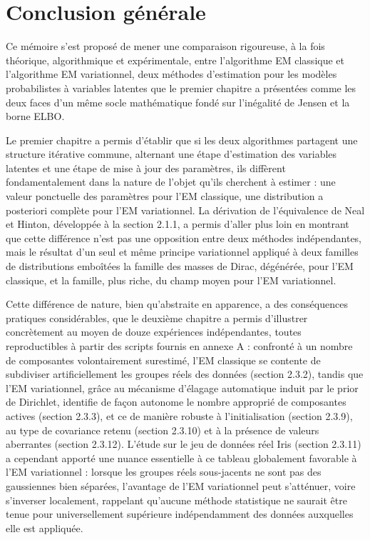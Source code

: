 \chapter*{Conclusion générale}
Ce mémoire s'est proposé de mener une comparaison rigoureuse, à la fois théorique, algorithmique et expérimentale, entre l'algorithme EM classique et l'algorithme EM variationnel, deux méthodes d'estimation pour les modèles probabilistes à variables latentes que le premier chapitre a présentées comme les deux faces d'un même socle mathématique fondé sur l'inégalité de Jensen et la borne ELBO.

Le premier chapitre a permis d'établir que si les deux algorithmes partagent une structure itérative commune, alternant une étape d'estimation des variables latentes et une étape de mise à jour des paramètres, ils diffèrent fondamentalement dans la nature de l'objet qu'ils cherchent à estimer : une valeur ponctuelle des paramètres pour l'EM classique, une distribution a posteriori complète pour l'EM variationnel. La dérivation de l'équivalence de Neal et Hinton, développée à la section 2.1.1, a permis d'aller plus loin en montrant que cette différence n'est pas une opposition entre deux méthodes indépendantes, mais le résultat d'un seul et même principe variationnel appliqué à deux familles de distributions emboîtées  la famille des masses de Dirac, dégénérée, pour l'EM classique, et la famille, plus riche, du champ moyen pour l'EM variationnel.

Cette différence de nature, bien qu'abstraite en apparence, a des conséquences pratiques considérables, que le deuxième chapitre a permis d'illustrer concrètement au moyen de douze expériences indépendantes, toutes reproductibles à partir des scripts fournis en annexe A : confronté à un nombre de composantes volontairement surestimé, l'EM classique se contente de subdiviser artificiellement les groupes réels des données (section 2.3.2), tandis que l'EM variationnel, grâce au mécanisme d'élagage automatique induit par le prior de Dirichlet, identifie de façon autonome le nombre approprié de composantes actives (section 2.3.3), et ce de manière robuste à l'initialisation (section 2.3.9), au type de covariance retenu (section 2.3.10) et à la présence de valeurs aberrantes (section 2.3.12). L'étude sur le jeu de données réel Iris (section 2.3.11) a cependant apporté une nuance essentielle à ce tableau globalement favorable à l'EM variationnel : lorsque les groupes réels sous-jacents ne sont pas des gaussiennes bien séparées, l'avantage de l'EM variationnel peut s'atténuer, voire s'inverser localement, rappelant qu'aucune méthode statistique ne saurait être tenue pour universellement supérieure indépendamment des données auxquelles elle est appliquée.

